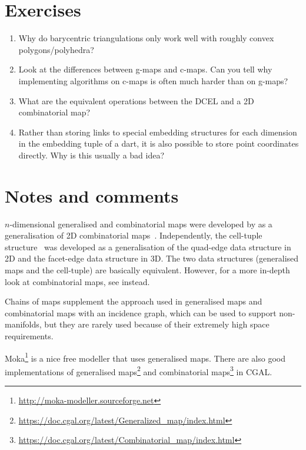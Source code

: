 %
\section{Exercises}

\begin{enumerate}
	\item Why do barycentric triangulations only work well with roughly convex polygons/polyhedra?
	\item Look at the differences between g-maps and c-maps. Can you tell why implementing algorithms on c-maps is often much harder than on g-maps?
	\item What are the equivalent operations between the DCEL and a 2D combinatorial map?
	\item Rather than storing links to special embedding structures for each dimension in the embedding tuple of a dart, it is also possible to store point coordinates directly. Why is this usually a bad idea?
\end{enumerate}



%
\section{Notes and comments}

\(n\)-dimensional generalised and combinatorial maps were developed by \citet{Lienhardt94} as a generalisation of 2D combinatorial maps~\citep{Edmonds60}.
Independently, the cell-tuple structure~\citep{Brisson89} was developed as a generalisation of the quad-edge \citep{Guibas85} data structure in 2D and the facet-edge data structure \citep{Dobkin87} in 3D.
The two data structures (generalised maps and the cell-tuple) are basically equivalent.
However, for a more in-depth look at combinatorial maps, see \citet{Damiand14} instead.

Chains of maps \citep{Elter94} supplement the approach used in generalised maps and combinatorial maps with an incidence graph, which can be used to support non-manifolds, but they are rarely used because of their extremely high space requirements.

Moka\footnote{\url{http://moka-modeller.sourceforge.net}} is a nice free modeller that uses generalised maps.
There are also good implementations of generalised maps\footnote{\url{https://doc.cgal.org/latest/Generalized_map/index.html}} and combinatorial maps\footnote{\url{https://doc.cgal.org/latest/Combinatorial_map/index.html}} in CGAL\@.






